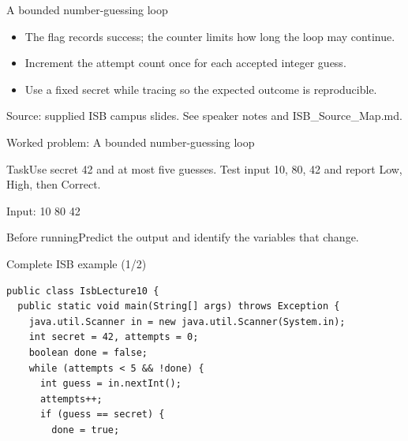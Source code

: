 \documentclass[10pt,aspectratio=169]{beamer}
\begin{document}
\begin{frame}[fragile,t]{A bounded number{-}guessing loop}
\begin{itemize}
\item The flag records success; the counter limits how long the loop may continue.
\item Increment the attempt count once for each accepted integer guess.
\item Use a fixed secret while tracing so the expected outcome is reproducible.
\end{itemize}
\vspace{3mm}\footnotesize\textcolor{accent}{Source: supplied ISB campus slides. See speaker notes and ISB\_Source\_Map.md.}
\end{frame}

\begin{frame}[fragile,t]{Worked problem: A bounded number{-}guessing loop}
\begin{block}{Task}Use secret 42 and at most five guesses. Test input 10, 80, 42 and report Low, High, then Correct.\end{block}
\small Input: 10 80 42\par\vspace{3mm}\begin{exampleblock}{Before running}Predict the output and identify the variables that change.\end{exampleblock}
\end{frame}

\begin{frame}[fragile,t]{Complete ISB example (1/2)}
\begin{lstlisting}
public class IsbLecture10 {
  public static void main(String[] args) throws Exception {
    java.util.Scanner in = new java.util.Scanner(System.in);
    int secret = 42, attempts = 0;
    boolean done = false;
    while (attempts < 5 && !done) {
      int guess = in.nextInt();
      attempts++;
      if (guess == secret) {
        done = true;
\end{lstlisting}
\end{frame}
\end{document}

